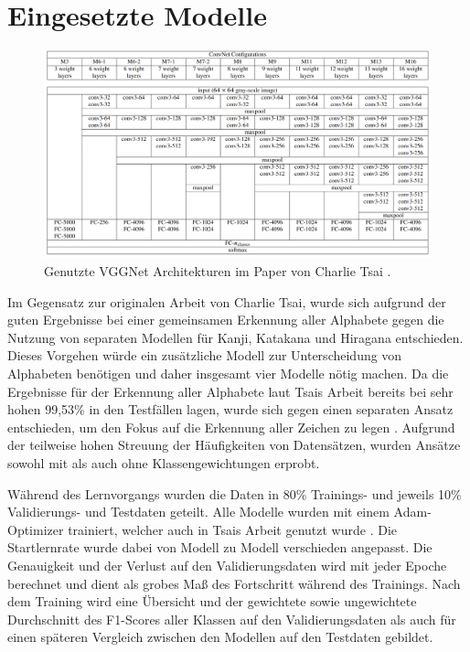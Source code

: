 \documentclass[twoside,a4paper]{IEEEtran}
\begin{document}
\section{Eingesetzte Modelle}
\begin{figure}[!htb]
	\centering
	\includegraphics[width=2.1\columnwidth]{conv_net_architectures}
	\caption{Genutzte VGGNet Architekturen im Paper von Charlie Tsai \cite[S.3]{RHC}.}
	\label{vggnet}
\end{figure}
Im Gegensatz zur originalen Arbeit von Charlie Tsai, wurde sich aufgrund der guten Ergebnisse bei einer gemeinsamen Erkennung aller Alphabete gegen die Nutzung von separaten Modellen für Kanji, Katakana und Hiragana entschieden. Dieses Vorgehen würde ein zusätzliche Modell zur Unterscheidung von Alphabeten benötigen und daher insgesamt vier Modelle nötig machen. Da die Ergebnisse für der Erkennung aller Alphabete laut Tsais Arbeit bereits bei sehr hohen 99,53\% in den Testfällen lagen, wurde sich gegen einen separaten Ansatz entschieden, um den Fokus auf die Erkennung aller Zeichen zu legen \cite[S.4-6]{RHC}. Aufgrund der teilweise hohen Streuung der Häufigkeiten von Datensätzen, wurden Ansätze sowohl mit als auch ohne Klassengewichtungen erprobt.

Während des Lernvorgangs wurden die Daten in 80\% Trainings- und jeweils 10\% Validierungs- und Testdaten geteilt. Alle Modelle wurden mit einem Adam-Optimizer trainiert, welcher auch in Tsais Arbeit genutzt wurde \cite[S.4]{RHC}. Die Startlernrate wurde dabei von Modell zu Modell verschieden angepasst. Die Genauigkeit und der Verlust auf den Validierungsdaten wird mit jeder Epoche berechnet und dient als grobes Maß des Fortschritt während des Trainings. Nach dem Training wird eine Übersicht und der gewichtete sowie ungewichtete Durchschnitt des F1-Scores aller Klassen auf den Validierungsdaten als auch für einen späteren Vergleich zwischen den Modellen auf den Testdaten gebildet.
\end{document}
